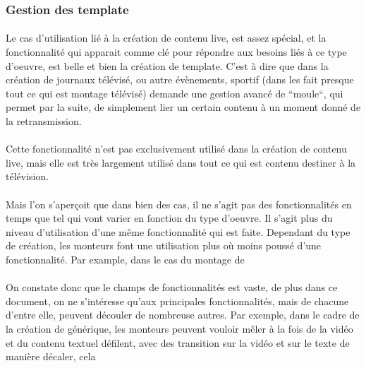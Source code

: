     \subsubsection{Gestion des template}
      \paragraph{ }
        Le cas d'utilisation lié à la création de contenu live, est assez spécial, et la fonctionnalité
        qui apparait comme clé pour répondre aux besoins liés à ce type d'oeuvre, est belle et bien la
        création de template. C'est à dire que dans la création de journaux télévisé, ou autre évènements,
        sportif (dans les fait presque tout ce qui est montage télévisé) demande une gestion avancé de ``moule``,
        qui permet par la suite, de simplement lier un certain contenu à un moment donné de la retransmission.

      \paragraph{ }
        Cette fonctionnalité n'est pas exclusivement utilisé dans la création de contenu live, mais
        elle est très largement utilisé dans tout ce qui est contenu destiner à la télévision.

    \paragraph{}
    \paragraph{}
      Mais l'on s'aperçoit que dans bien des cas, il ne s'agit pas des fonctionnalités en temps
      que tel qui vont varier en fonction du type d'oeuvre. Il s'agit plus du niveau d'utilisation
      d'une même fonctionnalité qui est faite. Dependant du type de création, les monteurs font
      une utilisation plus où moins poussé d'une fonctionnalité. Par example, dans le cas du montage
      de


  \paragraph{}
    On constate donc que le champs de fonctionnalités est vaste, de plus dans ce
    document, on ne s'intéresse qu'aux principales fonctionnalités, mais de chacune
    d'entre elle, peuvent découler de nombreuse autres. Par exemple, dans le cadre
    de la création de générique, les monteurs peuvent vouloir mêler à la fois de la
    vidéo et du contenu textuel défilent, avec des transition sur la vidéo et sur le
    texte de manière décaler, cela
